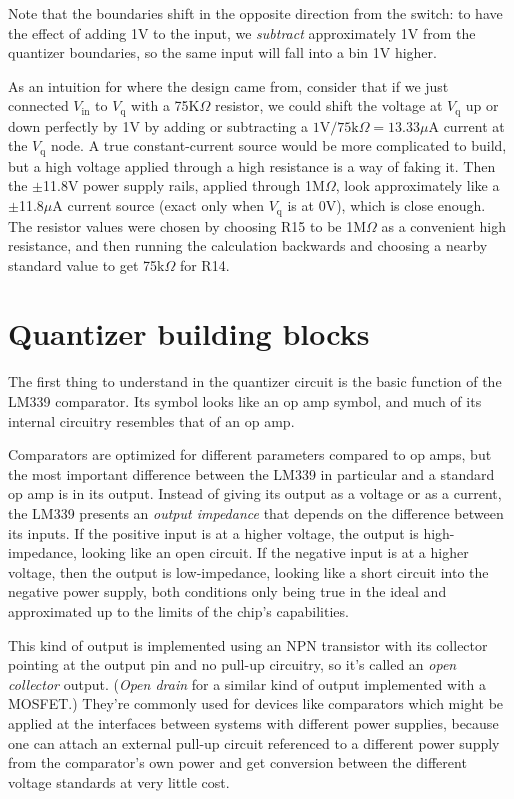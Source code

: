 Note that the boundaries shift in the opposite direction from the switch:
to have the effect of adding 1V to the input, we \emph{subtract}
approximately 1V from the quantizer boundaries, so the same input will fall
into a bin 1V higher.

As an intuition for where the design came from, consider that if we just
connected $V_\textrm{in}$ to $V_\textrm{q}$ with a 75K$\Omega$ resistor, we
could shift the voltage at $V_\textrm{q}$ up or down perfectly by 1V by
adding or subtracting a $1\textrm{V}/75\textrm{k}\Omega=13.33\mu\textrm{A}$
current at the $V_\textrm{q}$ node.  A true constant-current source would be
more complicated to build, but a high voltage applied through a high
resistance is a way of faking it.  Then the $\pm$11.8V power supply rails,
applied through 1M$\Omega$, look approximately like a $\pm$11.8$\mu$A
current source (exact only when $V_\textrm{q}$ is at 0V), which is close
enough.  The resistor values were chosen by choosing R15 to be 1M$\Omega$ as
a convenient high resistance, and then running the calculation backwards and
choosing a nearby standard value to get 75k$\Omega$ for R14.

\section{Quantizer building blocks}

The first thing to understand in the quantizer circuit is the basic function
of the LM339 comparator.  Its symbol looks like an op amp symbol, and much
of its internal circuitry resembles that of an op amp.

{\centering\par}

Comparators are optimized for different parameters compared to op amps, but
the most important difference between the LM339 in particular and a standard
op amp is in its output.  Instead of giving its output as a voltage or as a
current, the LM339 presents an \emph{output impedance} that depends on the
difference between its inputs.  If the positive input is at a higher
voltage, the output is high-impedance, looking like an open circuit.  If the
negative input is at a higher voltage, then the output is low-impedance,
looking like a short circuit into the negative power supply, both conditions
only being true in the ideal and approximated up to the limits of the
chip's capabilities.

This kind of output is implemented using an NPN
transistor with its collector pointing at the output pin and no pull-up
circuitry, so it's called an \emph{open collector} output.  (\emph{Open
drain} for a similar kind of output implemented with a MOSFET.)  They're
commonly used for devices like comparators which might be applied at the
interfaces between systems with different power supplies, because one can
attach an external pull-up circuit referenced to a different power
supply from the comparator's own power and get conversion between the
different voltage standards at very little cost.

